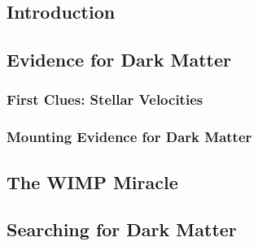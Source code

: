 \subsection{Introduction\label{sec:intro2dm}}

\subsection{Evidence for Dark Matter\label{sec:evidence4dm}}

\subsubsection{First Clues: Stellar Velocities\label{sec:ev4dm_stars}}

\subsubsection{Mounting Evidence for Dark Matter\label{secc:ev4dm_more}}

\subsection{The WIMP Miracle\label{sec:dm_wimps}}

\subsection{Searching for Dark Matter\label{dm_search}}

